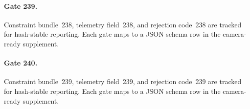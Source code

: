 \documentclass[sigconf,nonacm]{acmart}
\begin{document}
\paragraph{Gate 239.}
Constraint bundle~238, telemetry field~238, and rejection code~238 are tracked for hash-stable reporting. Each gate maps to a JSON schema row in the camera-ready supplement. %

\paragraph{Gate 240.}
Constraint bundle~239, telemetry field~239, and rejection code~239 are tracked for hash-stable reporting. Each gate maps to a JSON schema row in the camera-ready supplement. %




\end{document}

